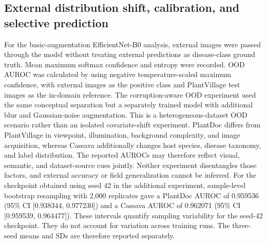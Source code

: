 \documentclass{sbc2023}%
\begin{document}
\subsection{External distribution shift, calibration, and selective prediction}
For the basic-augmentation EfficientNet-B0 analysis, external images were passed through the model without treating external predictions as disease-class ground truth. Mean maximum softmax confidence and entropy were recorded. OOD AUROC was calculated by using negative temperature-scaled maximum confidence, with external images as the positive class and PlantVillage test images as the in-domain reference. The corruption-aware OOD experiment used the same conceptual separation but a separately trained model with additional blur and Gaussian-noise augmentation. This is a heterogeneous-dataset OOD scenario rather than an isolated covariate-shift experiment. PlantDoc differs from PlantVillage in viewpoint, illumination, background complexity, and image acquisition, whereas Cassava additionally changes host species, disease taxonomy, and label distribution. The reported AUROCs may therefore reflect visual, semantic, and dataset-source cues jointly. Neither experiment disentangles those factors, and external accuracy or field generalization cannot be inferred. For the checkpoint obtained using seed 42 in the additional experiment, sample-level bootstrap resampling with 2,000 replicates gave a PlantDoc AUROC of 0.959536 (95\% CI [0.938344, 0.977230]) and a Cassava AUROC of 0.962071 (95\% CI [0.959539, 0.964477]). These intervals quantify sampling variability for the seed-42 checkpoint. They do not account for variation across training runs. The three-seed means and SDs are therefore reported separately.
\end{document}
